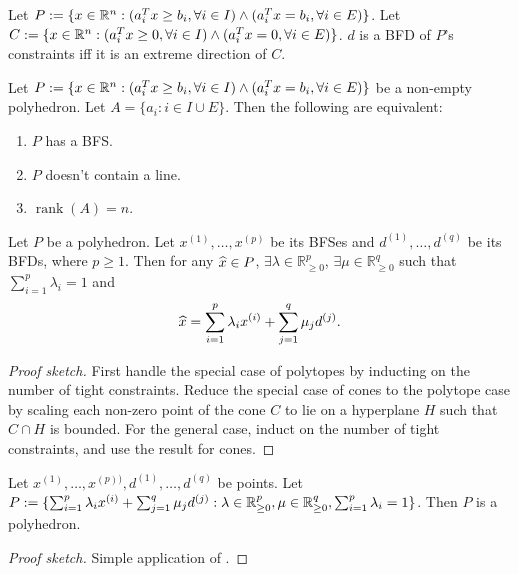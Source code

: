 \documentclass[a4paper, 12pt, fleqn]{article}
\newenvironment*{tightenum}{\begin{enumerate}[noitemsep]}{\end{enumerate}}
\DeclareMathOperator{\rank}{rank}
\begin{document}
\begin{theorem}
Let $P := \{x \in \mathbb{R}^n: (a_i^Tx \ge b_i, \forall i \in I) \wedge (a_i^Tx = b_i, \forall i \in E)\}$.
Let $C := \{x \in \mathbb{R}^n: (a_i^Tx \ge 0, \forall i \in I) \wedge (a_i^Tx = 0, \forall i \in E)\}$.
$d$ is a BFD of $P$'s constraints iff it is an extreme direction of $C$.
\end{theorem}

\begin{theorem}
Let $P := \{x \in \mathbb{R}^n: (a_i^Tx \ge b_i, \forall i \in I) \wedge (a_i^Tx = b_i, \forall i \in E)\}$
be a non-empty polyhedron. Let $A = \{a_i: i \in I \cup E\}$. Then the following are equivalent:
\begin{tightenum}
\item $P$ has a BFS.
\item $P$ doesn't contain a line.
\item $\rank(A) = n$.
\end{tightenum}
\end{theorem}

\begin{theorem}
Let $P$ be a polyhedron. Let $x^{(1)}, \ldots, x^{(p)}$ be its BFSes and
$d^{(1)}, \ldots, d^{(q)}$ be its BFDs, where $p \ge 1$. Then for any $\widehat{x} \in P$,
$\exists \lambda \in \mathbb{R}^p_{\ge 0}$, $\exists \mu \in \mathbb{R}^q_{\ge 0}$ such that
$\sum_{i=1}^p \lambda_i = 1$ and
\[ \widehat{x} = \sum_{i=1}^p \lambda_ix^{(i)} + \sum_{j=1}^q \mu_jd^{(j)}. \]
\end{theorem}
\begin{proof}[Proof sketch]
First handle the special case of polytopes by inducting on the number of tight constraints.
Reduce the special case of cones to the polytope case by
scaling each non-zero point of the cone $C$ to lie on a hyperplane $H$
such that $C \cap H$ is bounded.
For the general case, induct on the number of tight constraints, and use the result for cones.
\end{proof}

\begin{theorem}
Let $x^{(1)}, \ldots, x^{(p))}, d^{(1)}, \ldots, d^{(q)}$ be points.
Let $P := \{\sum_{i=1}^p \lambda_ix^{(i)} + \sum_{j=1}^q \mu_jd^{(j)}:
\lambda \in \mathbb{R}^p_{\ge 0}, \mu \in \mathbb{R}^q_{\ge 0}, \sum_{i=1}^p \lambda_i = 1\}$.
Then $P$ is a polyhedron.
\end{theorem}
\begin{proof}[Proof sketch]
Simple application of .
\end{proof}
\end{document}
